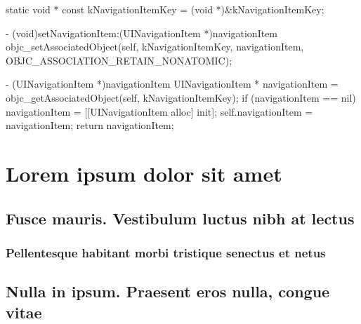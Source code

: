 \documentclass[10pt]{extarticle}
\newenvironment{codelisting}
{\footnotesize\mdframed[middlelinewidth=0.5pt, middlelinecolor=BaliHaiColor, skipabove=15pt]\verbatim}
{\endverbatim\endmdframed\vspace{12pt}\normalsize}
\newenvironment{tiplisting}
{\small\mdframed[middlelinewidth=0.5pt, middlelinecolor=GoldenDreamColor, skipabove=15pt]{\textbf{Tip:}}}
{\endmdframed\vspace{12pt}\normalsize}
\begin{document}
\lipsum[8]

\begin{codelisting}
static void * const kNavigationItemKey = (void *)&kNavigationItemKey;

- (void)setNavigationItem:(UINavigationItem *)navigationItem
{
    objc_setAssociatedObject(self, 
                             kNavigationItemKey, 
                             navigationItem, 
                             OBJC_ASSOCIATION_RETAIN_NONATOMIC);
}

- (UINavigationItem *)navigationItem
{
    UINavigationItem * navigationItem = objc_getAssociatedObject(self, kNavigationItemKey);
    if (navigationItem == nil) {
        navigationItem = [[UINavigationItem alloc] init];
        self.navigationItem = navigationItem;
    }
    return navigationItem;
}
\end{codelisting}

\lipsum[9]

\section{Lorem ipsum dolor sit amet}

\begin{tiplisting}
\lipsum[10-11]
\end{tiplisting}

\subsection{Fusce mauris. Vestibulum luctus nibh at lectus}

\begin{tiplisting}
\lipsum[12-13]
\end{tiplisting}

\subsubsection{Pellentesque habitant morbi tristique senectus et netus}

\begin{tiplisting}
\lipsum[14]
\end{tiplisting}

\subsection{Nulla in ipsum. Praesent eros nulla, congue vitae}

\lipsum[15]
\end{document}
